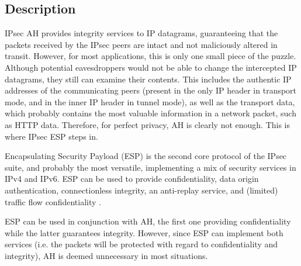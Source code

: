 \documentclass[a4paper,12pt]{report}
\begin{document}
		\subsection{Description}
		IPsec AH provides integrity services to IP datagrams, guaranteeing that the packets received by the IPsec peers are intact and not maliciously altered in transit. However, for most applications, this is only one small piece of the puzzle. Although potential eavesdroppers would not be able to change the intercepted IP datagrams, they still can examine their contents. This includes the authentic IP addresses of the communicating peers (present in the only IP header in transport mode, and in the inner IP header in tunnel mode), as well as the transport data, which probably contains the most valuable information in a network packet, such as HTTP data. Therefore, for perfect privacy, AH is clearly not enough. This is where IPsec ESP steps in.
		
		Encapsulating Security Payload (ESP) is the second core protocol of the IPsec suite, and probably the most versatile, implementing a mix of security services in IPv4 and IPv6. ESP can be used to provide confidentiality, data origin authentication, connectionless integrity, an anti-replay service, and (limited) traffic flow confidentiality \cite{rfc4303}.
		
		ESP can be used in conjunction with AH, the first one providing confidentiality while the latter guarantees integrity. However, since ESP can implement both services (i.e. the packets will be protected with regard to confidentiality and integrity), AH is deemed unnecessary in most situations.
		
\end{document}
